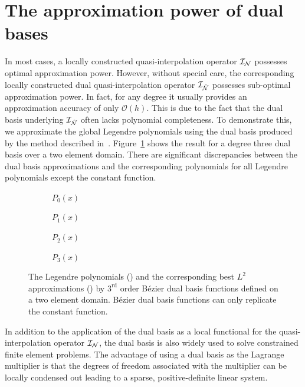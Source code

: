 \section{The approximation power of dual bases}\label{sec:approximation}
In most cases, a locally constructed quasi-interpolation operator $\mathcal{I}_\mathcal{N}$ possesses optimal approximation power. However, without special care, the corresponding locally constructed dual quasi-interpolation operator $\mathcal{I}_{\hat{\mathcal{N}}}$ possesses sub-optimal approximation power. In fact, for any degree it usually provides an approximation accuracy of only $\mathcal{O}(h)$. This is due to the fact that the dual basis underlying $\mathcal{I}_{\hat{\mathcal{N}}}$ often lacks polynomial completeness. To demonstrate this, we approximate the global Legendre polynomials using the dual basis produced by the method described in~\cite{thomas_bezier_2015}. Figure~\ref{fig:polynomial_completeness} shows the result for a degree three dual basis over a two element domain. There are significant discrepancies between the dual basis approximations and the corresponding polynomials for all Legendre polynomials except the constant function.

\begin{figure}[ht]
	\captionsetup[subfigure]{labelformat=empty, font = footnotesize}
	\centering
	\begin{subfigure}[b]{0.24\textwidth}
		\centering
		
		\caption{$P_0(x)$}
	\end{subfigure}
	\begin{subfigure}[b]{0.24\textwidth}
		\centering
		
		\caption{$P_1(x)$}
	\end{subfigure}
	\begin{subfigure}[b]{0.24\textwidth}
		\centering
		
		\caption{$P_2(x)$}
	\end{subfigure}
	\begin{subfigure}[b]{0.24\textwidth}
		\centering
		
		\caption{$P_3(x)$}
	\end{subfigure}
	\caption{The Legendre polynomials (\protect\blueline) and the corresponding best $L^2$ approximations (\protect\redline) by $3^\text{rd}$ order B\'ezier dual basis functions defined on a two element domain. B\'ezier dual basis functions can only replicate the constant function.}
	\label{fig:polynomial_completeness}
\end{figure}

In addition to the application of the dual basis as a local functional for the quasi-interpolation operator $\mathcal{I}_\mathcal{N}$, the dual basis is also widely used to solve constrained finite element problems. The advantage of using a dual basis as the Lagrange multiplier is that the degrees of freedom associated with the multiplier can be locally condensed out leading to a sparse, positive-definite linear system.

